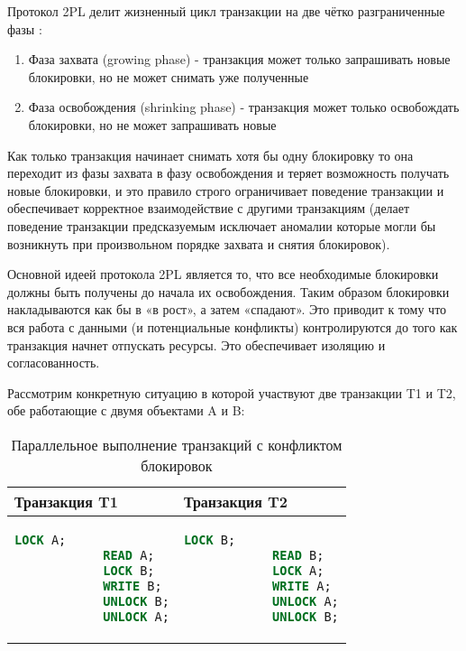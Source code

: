 Протокол 2PL делит жизненный цикл транзакции на две чётко разграниченные фазы \autocite[ch.18 §1.3]{Silberschatz}:

\begin{enumerate}
    \item Фаза захвата (growing phase) - транзакция может только запрашивать новые блокировки, но не может снимать уже полученные
    \item Фаза освобождения (shrinking phase) - транзакция может только освобождать блокировки, но не может запрашивать новые
\end{enumerate}

Как только транзакция начинает снимать хотя бы одну блокировку то она переходит из фазы захвата в фазу освобождения и теряет возможность получать новые блокировки, и это правило строго ограничивает поведение транзакции и обеспечивает корректное взаимодействие с другими транзакциям (делает поведение транзакции предсказуемым \textrightarrow исключает аномалии которые могли бы возникнуть при произвольном порядке захвата и снятия блокировок). \autocites[ch.18 §1.3]{Silberschatz}[ch.22 §1.2]{ElmasriNavathe}

Основной идеей протокола 2PL является то, что все необходимые блокировки должны быть получены до начала их освобождения. Таким образом блокировки накладываются как бы в «в рост», а затем «спадают». Это приводит к тому что вся работа с данными (и потенциальные конфликты) контролируются до того как транзакция начнет отпускать ресурсы. Это обеспечивает изоляцию и согласованность. \autocite[ch.18 §1.3]{Silberschatz}

Рассмотрим конкретную ситуацию в которой участвуют две транзакции T1 и T2, обе работающие с двумя объектами A и B:
\begin{table}[H]
    \centering
    \begin{tabular}{|p{7cm}|p{7cm}|}
        \hline
        \textbf{Транзакция T1} & \textbf{Транзакция T2} \\
        \hline
        \begin{lstlisting}[language=SQL]
            LOCK A;
            READ A;
            LOCK B;
            WRITE B;
            UNLOCK B;
            UNLOCK A;
        \end{lstlisting}
        &
        \begin{lstlisting}[language=SQL]
            LOCK B;
            READ B;
            LOCK A;
            WRITE A;
            UNLOCK A;
            UNLOCK B;
        \end{lstlisting} \\
        \hline
    \end{tabular}
    \caption{Параллельное выполнение транзакций с конфликтом блокировок}
    \label{tab:conflict_transactions}
\end{table}
    
